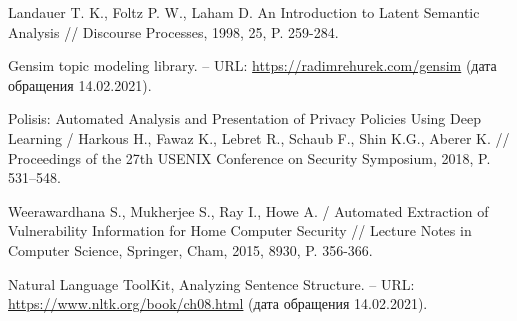 \documentclass[../main]{subfiles}
\begin{document}
\begin{english}
\begin{biblenum}
     Landauer T. K., Foltz P. W., Laham D. An Introduction to Latent Semantic Analysis // Discourse Processes, 1998, 25, P. 259-284.

     Gensim topic modeling library. -- URL: \url{https://radimrehurek.com/gensim} (\textrussian{дата обращения} 14.02.2021).

     Polisis: Automated Analysis and Presentation of Privacy Policies Using Deep Learning / Harkous H., Fawaz K., Lebret R., Schaub F., Shin K.G., Aberer K. // Proceedings of the 27th USENIX Conference on Security Symposium, 2018, P. 531–548.

     Weerawardhana S., Mukherjee S., Ray I., Howe A. / Automated Extraction of Vulnerability Information for Home Computer Security // Lecture Notes in Computer Science, Springer, Cham, 2015, 8930, P. 356-366.

     Natural Language ToolKit, Analyzing Sentence Structure. -- URL: \url{https://www.nltk.org/book/ch08.html} (\textrussian{дата обращения} 14.02.2021).


    





\end{biblenum}
\end{english}
\end{document}
